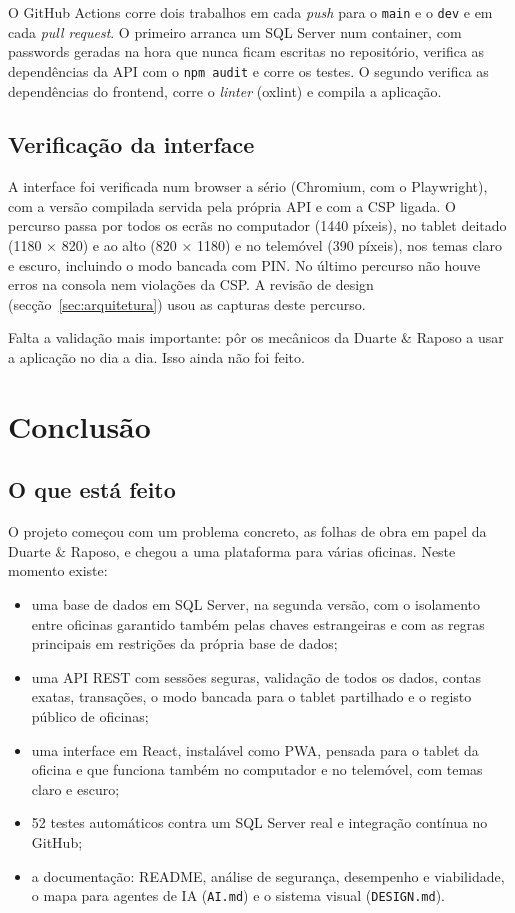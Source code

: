 \documentclass[a4paper,12pt]{article}
\begin{document}
O GitHub Actions corre dois trabalhos em cada \textit{push} para o \texttt{main} e o \texttt{dev} e em cada \textit{pull request}. O primeiro arranca um SQL Server num container, com passwords geradas na hora que nunca ficam escritas no repositório, verifica as dependências da \ac{API} com o \texttt{npm audit} e corre os testes. O segundo verifica as dependências do frontend, corre o \textit{linter} (oxlint) e compila a aplicação.

\subsection{Verificação da interface}

A interface foi verificada num browser a sério (Chromium, com o Playwright), com a versão compilada servida pela própria \ac{API} e com a \ac{CSP} ligada. O percurso passa por todos os ecrãs no computador (1440 píxeis), no tablet deitado (1180 × 820) e ao alto (820 × 1180) e no telemóvel (390 píxeis), nos temas claro e escuro, incluindo o modo bancada com PIN. No último percurso não houve erros na consola nem violações da \ac{CSP}. A revisão de design (secção~\ref{sec:arquitetura}) usou as capturas deste percurso.

Falta a validação mais importante: pôr os mecânicos da Duarte \& Raposo a usar a aplicação no dia a dia. Isso ainda não foi feito.

\section{Conclusão}
\label{sec:conclusao}

\subsection{O que está feito}

O projeto começou com um problema concreto, as folhas de obra em papel da Duarte \& Raposo, e chegou a uma plataforma para várias oficinas. Neste momento existe:
\begin{itemize}
    \item uma base de dados em SQL Server, na segunda versão, com o isolamento entre oficinas garantido também pelas chaves estrangeiras e com as regras principais em restrições da própria base de dados;
    \item uma \ac{API} REST com sessões seguras, validação de todos os dados, contas exatas, transações, o modo bancada para o tablet partilhado e o registo público de oficinas;
    \item uma interface em React, instalável como \ac{PWA}, pensada para o tablet da oficina e que funciona também no computador e no telemóvel, com temas claro e escuro;
    \item 52 testes automáticos contra um SQL Server real e integração contínua no GitHub;
    \item a documentação: README, análise de segurança, desempenho e viabilidade, o mapa para agentes de IA (\texttt{AI.md}) e o sistema visual (\texttt{DESIGN.md}).
\end{itemize}
\end{document}
